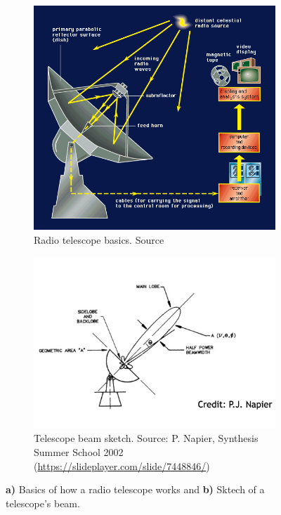 \begin{figure}[H]
    \centering
    \begin{subfigure}[t]{0.49\textwidth}
        \centering
        \includegraphics[width=\textwidth]{Astronomy/radio_telescope.png}
        \caption{Radio telescope basics. Source \cite{MarksPhysicsHelp}}
        \label{subfig:radio_telescope}
    \end{subfigure}
    \hfill
    \begin{subfigure}[t]{0.49\textwidth}
       \centering
       \includegraphics[width=\textwidth]{Astronomy/beamwidth_sketch_cropped.png}
       \caption{Telescope beam sketch. Source: P. Napier, Synthesis Summer School 2002 (\href{https://slideplayer.com/slide/7448846/}{https://slideplayer.com/slide/7448846/})}
       \label{subfig:beamwidth}
    \end{subfigure}
    \caption[Radio telescope basics]{\textbf{a)} Basics of how a radio telescope works and \textbf{b)} Sktech of a telescope's beam.}
    \label{fig:telescope_info}
\end{figure}


